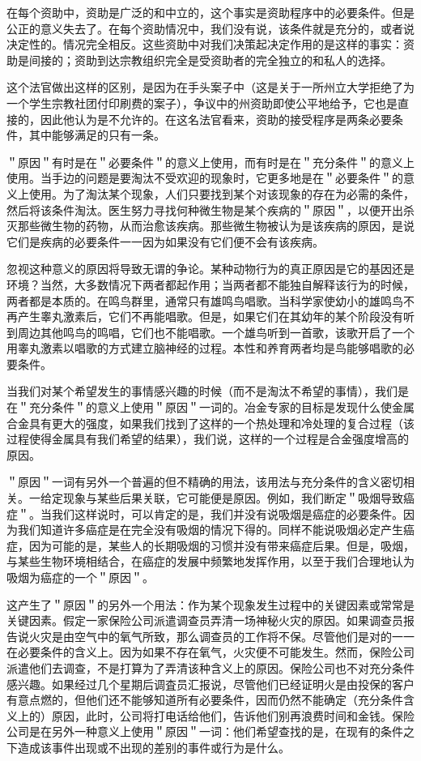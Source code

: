 在每个资助中，资助是广泛的和中立的，这个事实是资助程序中的必要条件。但是公正的意义失去了。在每个资助情况中，我们没有说，该条件就是充分的，或者说决定性的。情况完全相反。这些资助中对我们决策起决定作用的是这样的事实：资助是间接的；资助到达宗教组织完全是受资助者的完全独立的和私人的选择。

这个法官做出这样的区别，是因为在手头案子中（这是关于一所州立大学拒绝了为一个学生宗教社团付印刷费的案子），争议中的州资助即使公平地给予，它也是直接的，因此他认为是不允许的。在这名法官看来，资助的接受程序是两条必要条件，其中能够满足的只有一条。

＂原因＂有时是在＂必要条件＂的意义上使用，而有时是在＂充分条件＂的意义上使用。当手边的问题是要淘汰不受欢迎的现象时，它更多地是在＂必要条件＂的意义上使用。为了淘汰某个现象，人们只要找到某个对该现象的存在为必需的条件，然后将该条件淘汰。医生努力寻找何种微生物是某个疾病的＂原因＂，以便开出杀灭那些微生物的药物，从而治愈该疾病。那些微生物被认为是该疾病的原因，是说它们是疾病的必要条件一一因为如果没有它们便不会有该疾病。

忽视这种意义的原因将导致无谓的争论。某种动物行为的真正原因是它的基因还是环境？当然，大多数情况下两者都起作用；当两者都不能独自解释该行为的时候，两者都是本质的。在鸣鸟群里，通常只有雄鸣鸟唱歌。当科学家使幼小的雄鸣鸟不再产生睾丸激素后，它们不再能唱歌。但是，如果它们在其幼年的某个阶段没有听到周边其他鸣鸟的鸣唱，它们也不能唱歌。一个雄鸟听到一首歌，该歌开启了一个用睾丸激素以唱歌的方式建立脑神经的过程。本性和养育两者均是鸟能够唱歌的必要条件。\cite{marler1991}

当我们对某个希望发生的事情感兴趣的时候（而不是淘汰不希望的事情），我们是在＂充分条件＂的意义上使用＂原因＂一词的。冶金专家的目标是发现什么使金属合金具有更大的强度，如果我们找到了这样的一个热处理和冷处理的复合过程（该过程使得金属具有我们希望的结果），我们说，这样的一个过程是合金强度增高的原因。

＂原因＂一词有另外一个普遍的但不精确的用法，该用法与充分条件的含义密切相关。一给定现象与某些后果关联，它可能便是原因。例如，我们断定＂吸烟导致癌症＂。当我们这样说时，可以肯定的是，我们并没有说吸烟是癌症的必要条件。因为我们知道许多癌症是在完全没有吸烟的情况下得的。同样不能说吸烟必定产生癌症，因为可能的是，某些人的长期吸烟的习惯并没有带来癌症后果。但是，吸烟，与某些生物环境相结合，在癌症的发展中频繁地发挥作用，以至于我们合理地认为吸烟为癌症的一个＂原因＂。

这产生了＂原因＂的另外一个用法：作为某个现象发生过程中的关键因素或常常是关键因素。假定一家保险公司派遣调查员弄清一场神秘火灾的原因。如果调查员报告说火灾是由空气中的氧气所致，那么调查员的工作将不保。尽管他们是对的一一在必要条件的含义上。因为如果不存在氧气，火灾便不可能发生。然而，保险公司派遣他们去调查，不是打算为了弄清该种含义上的原因。保险公司也不对充分条件感兴趣。如果经过几个星期后调査员汇报说，尽管他们已经证明火是由投保的客户有意点燃的，但他们还不能够知道所有必要条件，因而仍然不能确定（充分条件含义上的）原因，此时，公司将打电话给他们，告诉他们别再浪费时间和金钱。保险公司是在另外一种意义上使用＂原因＂一词：他们希望查找的是，在现有的条件之下造成该事件出现或不出现的差别的事件或行为是什么。

